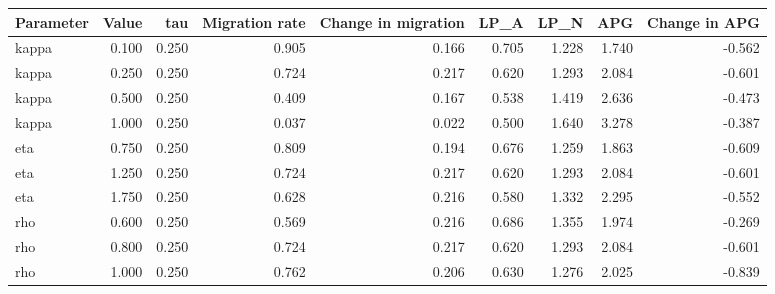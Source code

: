 \begin{tabular}{lrrrrrrrr}
\hline
Parameter & Value & tau & Migration rate & Change in migration & LP\_A & LP\_N & APG & Change in APG \\
\hline
kappa & 0.100 & 0.250 & 0.905 & 0.166 & 0.705 & 1.228 & 1.740 & -0.562 \\
kappa & 0.250 & 0.250 & 0.724 & 0.217 & 0.620 & 1.293 & 2.084 & -0.601 \\
kappa & 0.500 & 0.250 & 0.409 & 0.167 & 0.538 & 1.419 & 2.636 & -0.473 \\
kappa & 1.000 & 0.250 & 0.037 & 0.022 & 0.500 & 1.640 & 3.278 & -0.387 \\
eta & 0.750 & 0.250 & 0.809 & 0.194 & 0.676 & 1.259 & 1.863 & -0.609 \\
eta & 1.250 & 0.250 & 0.724 & 0.217 & 0.620 & 1.293 & 2.084 & -0.601 \\
eta & 1.750 & 0.250 & 0.628 & 0.216 & 0.580 & 1.332 & 2.295 & -0.552 \\
rho & 0.600 & 0.250 & 0.569 & 0.216 & 0.686 & 1.355 & 1.974 & -0.269 \\
rho & 0.800 & 0.250 & 0.724 & 0.217 & 0.620 & 1.293 & 2.084 & -0.601 \\
rho & 1.000 & 0.250 & 0.762 & 0.206 & 0.630 & 1.276 & 2.025 & -0.839 \\
\hline
\end{tabular}
